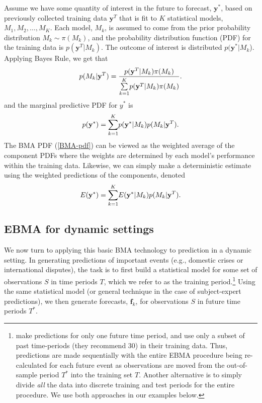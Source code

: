 \documentclass[12pt,fullpage]{article}
\newcommand{\note}[1]{\footnote{\doublespacing#1 \vspace{4 mm}}}
\begin{document}
Assume we have some quantity of interest in the future to forecast,
$\mathbf{y}^*$, based on previously collected training data
$\mathbf{y}^T$ that is fit to $K$ statistical models, $M_1, M_2,
\ldots, M_K$. Each model, $M_k$, is assumed to come from the prior
probability distribution $M_k\sim \pi(M_k)$, and the probability
distribution function (PDF) for the training data is
$p(\mathbf{y}^T|M_k)$. The outcome of interest is distributed
$p(\mathbf{y}^*|M_k$).  Applying Bayes Rule, we get that
\begin{equation} \small
p(M_k|\mathbf{y}^T) = \frac{p(\mathbf{y}^T|M_k)\pi(M_k)}{\underset{k=1}{\overset{K}{\sum}}p(\mathbf{y}^T|M_k)\pi(M_k)}.
\end{equation}
\noindent and the marginal predictive PDF for $y^*$ is
\begin{equation}
\label{BMA-pdf}
\small
p(\mathbf{y}^*) = \underset{k=1}{\overset{K}{\sum}} p(\mathbf{y}^*|M_k)p(M_k|\mathbf{y}^T).
\end{equation}
The BMA PDF (\ref{BMA-pdf}) can be viewed as the weighted average of
the component PDFs where the weights are determined by each model's
performance within the training data.  Likewise, we can simply make a
deterministic estimate using the weighted predictions of the
components, denoted
\begin{equation} \small
E(\mathbf{y}^*) = \underset{k=1}{\overset{K}{\sum}} E(\mathbf{y}^*|M_k)p(M_k|\mathbf{y}^T).
\end{equation}

\subsection{EBMA for dynamic settings}

We now turn to applying this basic BMA technology to prediction in a
dynamic setting.  In generating predictions of important events (e.g.,
domestic crises or international disputes), the task is to first build
a statistical model for some set of observations $S$ in time periods
$T$, which we refer to as the training
period.\note{\citet{Sloughter:2007} make predictions for only one
  future time period, and use only a subset of past time-periods (they
  recommend 30) in their training data. Thus, predictions are made
  sequentially with the entire EBMA procedure being re-calculated for
  each future event as observations are moved from the out-of-sample
  period $T^*$ into the training set $T$. Another alternative is to
  simply divide \textit{all} the data into discrete training and test
  periods for the entire procedure.  We use both approaches in our
  examples below.}  Using the same statistical model (or general
technique in the case of subject-expert predictions), we then generate
forecasts, $\mathbf{f}_k$, for observations $S$ in future time periods
$T^*$.
\end{document}
